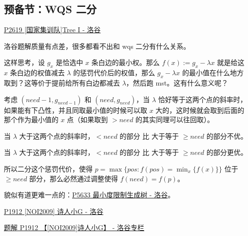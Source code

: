 \subsection{预备节：WQS 二分}

\href{https://www.luogu.com.cn/problem/P2619}{P2619 [国家集训队]Tree I - 洛谷}

洛谷题解质量有点差，很多都看不出和 wqs 二分有什么关系。

这样思考，设 $g_x$ 是恰选中 $x$ 条白边的最小权。那么 $f(x) := g_x - \lambda x$ 就是给这 $x$ 条白边的权值减去 $\lambda$ 的惩罚代价后的权值，那么 $g_x-\lambda x$ 的最小值在什么地方取到？这等价于提前给所有白边都减去 $\lambda$，然后跑 mst。这有什么意义呢？

考虑 $(need-1, g_{need-1})$ 和 $(need, g_{need})$，当 $\lambda$ 恰好等于这两个点的斜率时，如果能有下凸性，并且同取最小值的时候可以取 $x$ 大的，这时候就会取到后面的那个作为最小值的 $x$ 点（如果取到 $>need$ 的其实同理可以往回取）。

当 $\lambda$ 大于这两个点的斜率时，$< need$ 的部分 比 大于等于 $\ge need$ 的部分不优。

当 $\lambda$ 大于这两个点的斜率时，$< need$ 的部分 比 大于等于 $\ge need$ 的部分更优。

所以二分这个惩罚代价，使得 $p = \max\{pos : f(pos) = \min_{x}\{f(x)\}\}$ 位于 $\ge need$ 部分，那么必然通过调整使得 $f(need) = f(p)$。

貌似有道更难一点的：\href{https://www.luogu.com.cn/problem/P5633}{P5633 最小度限制生成树 - 洛谷}。

\href{https://www.luogu.com.cn/problem/P1912}{P1912 [NOI2009] 诗人小G - 洛谷}

\href{https://www.luogu.com.cn/article/e362a4cs}{题解 P1912 【[NOI2009]诗人小G】 - 洛谷专栏}

